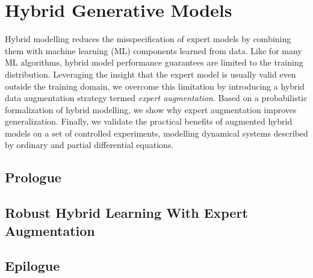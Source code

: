 \chapter{Hybrid Generative Models}\label{ch:07}

\begin{chapter_outline}

Hybrid modelling reduces the misspecification of expert models by combining them with machine learning (ML) components learned from data. Like for many ML algorithms, hybrid model performance guarantees are limited to the training distribution. Leveraging the insight that the expert model is usually valid even outside the training domain, we overcome this limitation by introducing a hybrid data augmentation strategy termed \textit{expert augmentation}. Based on a probabilistic formalization of hybrid modelling, we show why expert augmentation improves generalization. Finally, we validate the practical benefits of augmented hybrid models on a set of controlled experiments, modelling dynamical systems described by ordinary and partial differential equations.

\end{chapter_outline}

\section{Prologue}

\section{Robust Hybrid Learning With Expert Augmentation}


\section{Epilogue}
